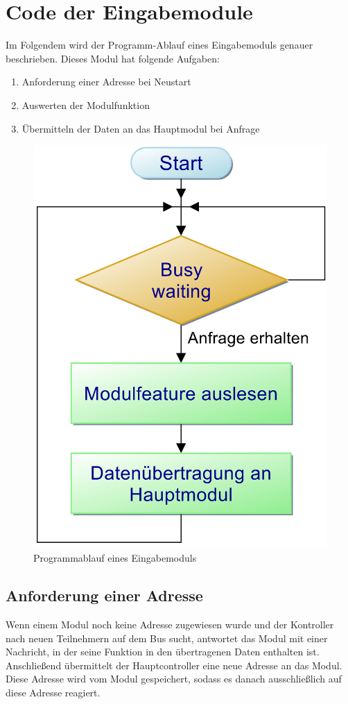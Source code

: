 


\section{Code der Eingabemodule}
\label{Code der Eingabemodule}
Im Folgendem wird der Programm-Ablauf eines Eingabemoduls genauer beschrieben. Dieses Modul hat folgende Aufgaben:
\begin{enumerate}
    \item Anforderung einer Adresse bei Neustart
    \item Auswerten der Modulfunktion
    \item Übermitteln der Daten an das Hauptmodul bei Anfrage
\end{enumerate}

\begin{figure}[H]
	\centering    
	\includegraphics[width=.75\textwidth]{Bilder/pap_eingabemodul.png}
	\caption{Programmablauf eines Eingabemoduls}
	\label{Programm_Eingabemodul}
\end{figure}


\subsection{Anforderung einer Adresse}
Wenn einem Modul noch keine Adresse zugewiesen wurde und der Kontroller nach neuen Teilnehmern auf dem Bus sucht, antwortet das Modul mit einer Nachricht, in der seine Funktion in den übertragenen Daten enthalten ist. Anschließend übermittelt der Hauptcontroller eine neue Adresse an das Modul. Diese Adresse wird vom Modul gespeichert, sodass es danach ausschließlich auf diese Adresse reagiert.\\

